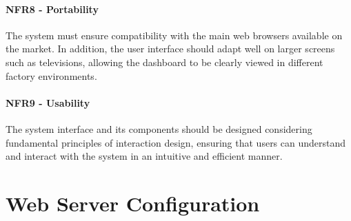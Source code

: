 \subsubsection{NFR8 - Portability}
The system must ensure compatibility with the main web browsers available on the market. In addition, the user interface should adapt well on larger screens such as televisions, allowing the dashboard to be clearly viewed in different factory environments.

\subsubsection{NFR9 - Usability}The system interface and its components should be designed considering fundamental principles of interaction design, ensuring that users can understand and interact with the system in an intuitive and efficient manner.


\chapter{Web Server Configuration}\label{webServer}

